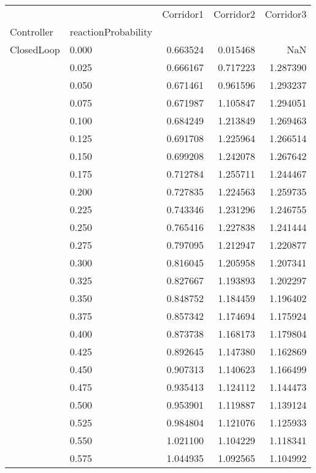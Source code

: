 \begin{tabular}{llrrr}
\toprule
         &       &  Corridor1 &  Corridor2 &  Corridor3 \\
Controller & reactionProbability &            &            &            \\
\midrule
ClosedLoop & 0.000 &   0.663524 &   0.015468 &        NaN \\
         & 0.025 &   0.666167 &   0.717223 &   1.287390 \\
         & 0.050 &   0.671461 &   0.961596 &   1.293237 \\
         & 0.075 &   0.671987 &   1.105847 &   1.294051 \\
         & 0.100 &   0.684249 &   1.213849 &   1.269463 \\
         & 0.125 &   0.691708 &   1.225964 &   1.266514 \\
         & 0.150 &   0.699208 &   1.242078 &   1.267642 \\
         & 0.175 &   0.712784 &   1.255711 &   1.244467 \\
         & 0.200 &   0.727835 &   1.224563 &   1.259735 \\
         & 0.225 &   0.743346 &   1.231296 &   1.246755 \\
         & 0.250 &   0.765416 &   1.227838 &   1.241444 \\
         & 0.275 &   0.797095 &   1.212947 &   1.220877 \\
         & 0.300 &   0.816045 &   1.205958 &   1.207341 \\
         & 0.325 &   0.827667 &   1.193893 &   1.202297 \\
         & 0.350 &   0.848752 &   1.184459 &   1.196402 \\
         & 0.375 &   0.857342 &   1.174694 &   1.175924 \\
         & 0.400 &   0.873738 &   1.168173 &   1.179804 \\
         & 0.425 &   0.892645 &   1.147380 &   1.162869 \\
         & 0.450 &   0.907313 &   1.140623 &   1.166499 \\
         & 0.475 &   0.935413 &   1.124112 &   1.144473 \\
         & 0.500 &   0.953901 &   1.119887 &   1.139124 \\
         & 0.525 &   0.984804 &   1.121076 &   1.125933 \\
         & 0.550 &   1.021100 &   1.104229 &   1.118341 \\
         & 0.575 &   1.044935 &   1.092565 &   1.104992 \\

\end{tabular}
